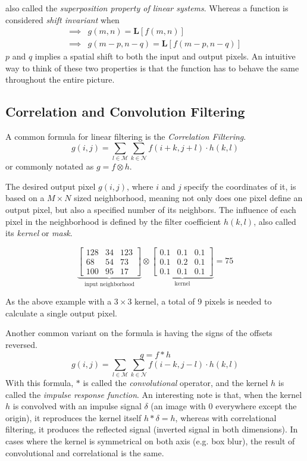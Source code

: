\documentclass[twoside,a4paper,article]{combine}
\begin{document}
also called the \emph{superposition property of linear systems}\cite{BovikActon09}. Whereas a function is considered \emph{shift invariant} when
\begin{align*}
    \implies & g(m, n) = \boldsymbol{L} [f(m, n)]\\
    \implies & g(m - p, n - q) =  \boldsymbol{L} [f(m - p, n - q)]
\end{align*} $p$ and $q$ implies a spatial shift to both the input and output pixels\cite{BovikActon09}. An intuitive way to think
of these two properties is that the function has to behave the same throughout the entire picture.

\subsection{Correlation and Convolution Filtering}
A common formula for linear filtering is the \emph{Correlation Filtering}\cite{BovikActon09}. 
\[
    g(i,j) = \sum_{l \in \mathscr{M}}\sum_{k \in \mathscr{N}}{f(i+k, j+l) \cdot h(k, l)}
\]
or commonly notated as $g = f \otimes h$.

The desired output pixel $g(i, j)$, where $i$ and $j$ specify the
coordinates of it, is based on a $M \times N$ sized neighborhood, 
meaning not only does one pixel define an output pixel, but also a specified number
of its neighbors. The influence of each pixel in the neighborhood is defined by the filter coefficient $h(k, l)$,
also called its \emph{kernel} or \emph{mask}\cite{Szeliski_2022}.

\[
\underbrace{
    \begin{bmatrix}
        128 & 34 & 123\\
        68 & 54 & 73 \\
        100 & 95 & 17
    \end{bmatrix}}_{\text{input neighborhood}}
\otimes
\underbrace{
    \begin{bmatrix}
        0.1 & 0.1 & 0.1\\
        0.1 & 0.2 & 0.1\\
        0.1 & 0.1 & 0.1
    \end{bmatrix}}_{\text{kernel}}
= 75
\]

As the above example with a $3 \times 3$ kernel, a total of 9 pixels is needed to calculate a single output pixel.

Another common variant on the formula is having the signs of the offsets reversed. 
\[
    g = f \ast h
\]
\[
    g(i,j) = \sum_{l \in \mathscr{M}}\sum_{k \in \mathscr{N}}{f(i-k, j-l) \cdot h(k, l)}
\]
With this formula, $\ast$ is called the \emph{convolutional} operator, and the kernel $h$ is called the \emph{impulse response function}. 
An interesting note is that, when the kernel $h$ is convolved with an impulse signal $\delta$ (an image with 0 everywhere except the origin),
it reproduces the kernel itself $h \ast \delta = h$, whereas with correlational filtering, 
it produces the reflected signal (inverted signal in both dimensions).\cite{Szeliski_2022} In cases
where the kernel is symmetrical on both axis (e.g. box blur), the result of convolutional and correlational is the same.
\end{document}
